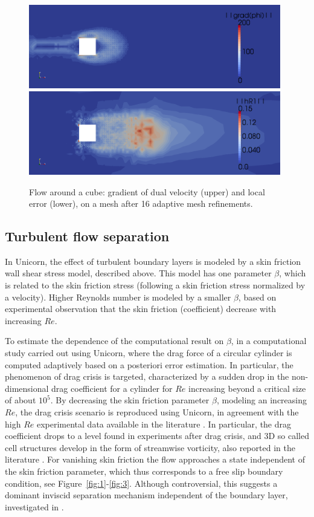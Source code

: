 \begin{figure}
\centering
\includegraphics[width=11cm]{chapters/hoffman-1/png/fig3a.png}
\medskip
\includegraphics[width=11cm]{chapters/hoffman-1/png/fig3b.png}
\caption{Flow around a cube: gradient of dual velocity (upper) and local
error (lower), on a mesh after 16 adaptive mesh refinements.}
\label{fig:cube3}
\end{figure}


\subsection{Turbulent flow separation}

In Unicorn, the effect of turbulent boundary layers is modeled by a
skin friction wall shear stress model, described above. This model has
one parameter $\beta$, which is related to the skin friction stress
(following \citet{Schumann1975} a skin friction stress normalized by
a velocity). Higher Reynolds number is modeled by a smaller $\beta$,
based on experimental observation that the skin friction (coefficient)
decrease with increasing $Re$.

To estimate the dependence of the computational result on $\beta$,
in \citet{HoffmanJansson2009} a computational study carried out using
Unicorn, where the drag force of a circular cylinder is computed
adaptively based on a posteriori error estimation. In particular,
the phenomenon of drag crisis is targeted, characterized by a sudden
drop in the non-dimensional drag coefficient for a cylinder for $Re$
increasing beyond a critical size of about $10^5$. By decreasing
the skin friction parameter $\beta$, modeling an increasing $Re$,
the drag crisis scenario is reproduced using Unicorn, in agreement
with the high $Re$ experimental data available in the literature
\citep{Zdravkovich2003}. In particular, the drag coefficient drops
to a level found in experiments after drag crisis, and 3D so called
cell structures develop in the form of streamwise vorticity, also
reported in the literature \citep{Zdravkovich2003}.  For vanishing skin
friction the flow approaches a state independent of the skin friction
parameter, which thus corresponds to a free slip boundary condition, see
Figure~\ref{fig:1}-\ref{fig:3}. Although controversial, this suggests a
dominant inviscid separation mechanism independent of the boundary layer,
investigated in \citet{HoffmanJohnson2008b,HoffmanJansson2009}.


